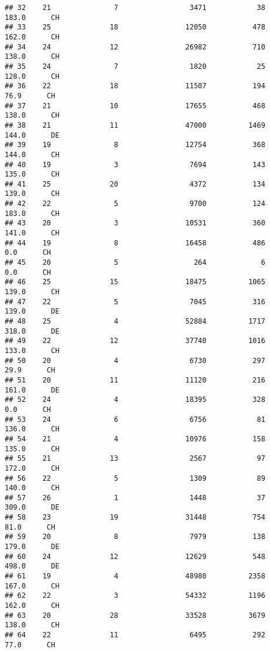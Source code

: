 \documentclass[
]{article}
\begin{document}
\begin{verbatim}
## 32    21               7                 3471            38    183.0      CH
## 33    25              18                12050           478    162.0      CH
## 34    24              12                26982           710    138.0      CH
## 35    24               7                 1820            25    128.0      CH
## 36    22              18                11507           194     76.9      CH
## 37    21              10                17655           468    138.0      CH
## 38    21              11                47000          1469    144.0      DE
## 39    19               8                12754           368    144.0      CH
## 40    19               3                 7694           143    135.0      CH
## 41    25              20                 4372           134    139.0      CH
## 42    22               5                 9700           124    183.0      CH
## 43    20               3                10531           360    141.0      CH
## 44    19               8                16458           486      0.0      CH
## 45    20               5                  264             6      0.0      CH
## 46    25              15                18475          1065    139.0      CH
## 47    22               5                 7045           316    139.0      DE
## 48    25               4                52884          1717    318.0      DE
## 49    22              12                37740          1016    133.0      CH
## 50    20               4                 6730           297     29.9      CH
## 51    20              11                11120           216    161.0      DE
## 52    24               4                18395           328      0.0      CH
## 53    24               6                 6756            81    136.0      CH
## 54    21               4                10976           158    135.0      CH
## 55    21              13                 2567            97    172.0      CH
## 56    22               5                 1309            89    140.0      CH
## 57    26               1                 1448            37    309.0      DE
## 58    23              19                31448           754     81.0      CH
## 59    20               8                 7979           138    179.0      DE
## 60    24              12                12629           548    498.0      DE
## 61    19               4                48980          2358    167.0      CH
## 62    22               3                54332          1196    162.0      CH
## 63    20              28                33528          3679    138.0      CH
## 64    22              11                 6495           292     77.0      CH

\end{verbatim}
\end{document}
